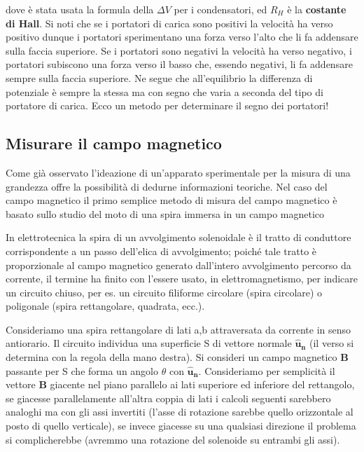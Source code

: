 \documentclass[
10pt, %
a4paper, %
oneside, %
headinclude,footinclude, %
BCOR5mm, %
]{scrartcl}
\begin{document}
\begin{applicazione}
dove è stata usata la formula della \(\Delta V\) per i condensatori, ed \(R_H\) è la \textbf{costante di Hall}. Si noti che se i portatori di carica sono positivi la velocità ha verso positivo dunque i portatori sperimentano una forza verso l'alto che li fa addensare sulla faccia superiore. Se i portatori sono negativi la velocità ha verso negativo, i portatori subiscono una forza verso il basso che, essendo negativi, li fa addensare sempre sulla faccia superiore. Ne segue che all'equilibrio la differenza di potenziale è sempre la stessa ma con segno che varia a seconda del tipo di portatore di carica. Ecco un metodo per determinare il segno dei portatori!
\end{applicazione}
\subsection{Misurare il campo magnetico}
Come già osservato l'ideazione di un'apparato sperimentale per la misura di una grandezza offre la possibilità di dedurne informazioni teoriche. Nel caso del campo magnetico il primo semplice metodo di misura del campo magnetico è basato sullo studio del moto di una spira immersa in un campo magnetico
\begin{definizione}[Spira]
	 In elettrotecnica la spira di un avvolgimento solenoidale è il tratto di conduttore corrispondente a un passo dell’elica di avvolgimento; poiché tale tratto è proporzionale al campo magnetico generato dall'intero avvolgimento percorso da corrente, il termine ha finito con l’essere usato, in elettromagnetismo, per indicare un circuito chiuso, per es. un circuito filiforme circolare (spira circolare) o poligonale (spira rettangolare, quadrata, ecc.).
\end{definizione}
Consideriamo una spira rettangolare di lati a,b attraversata da corrente in senso antiorario. Il circuito individua una superficie S di vettore normale $\mathbf{\hat{u}_n}$ (il verso si determina con la regola della mano destra). Si consideri un campo magnetico $\mathbf{B}$ passante per S che forma un angolo $\theta$ con $\mathbf{\hat{u}_n}$. Consideriamo per semplicità il vettore $\mathbf{B}$ giacente nel piano parallelo ai lati superiore ed inferiore del rettangolo, se giacesse parallelamente all'altra coppia di lati i calcoli seguenti sarebbero analoghi ma con gli assi invertiti (l'asse di rotazione sarebbe quello orizzontale al posto di quello verticale), se invece giacesse su una qualsiasi direzione il problema si complicherebbe (avremmo una rotazione del solenoide su entrambi gli assi).\\
\end{document}
